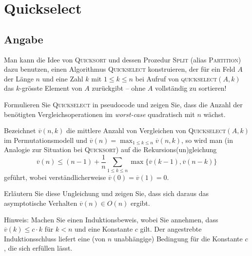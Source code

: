 \section*{Quickselect}

  \newcommand{\meanv}{\overline{v}}
  \lstset{ %
    language=Mathematica,
    basicstyle=\small,
    numbers=left,
    numberstyle=\small,
    numbersep=-9pt
  }
\subsection*{Angabe}
Man kann die Idee von \textsc{Quicksort} und dessen Prozedur \textsc{Split}
(alias \textsc{Partition}) dazu benutzen, einen Algorithmus
\textsc{Quickselect} konstruieren, der für ein Feld $A$ der Länge $n$ und eine
Zahl $k$ mit $1 \leq k \leq n$ bei Aufruf von \textsc{quickselect}$(A,k)$ das
$k$-grösste Element von $A$ zurückgibt -- ohne $A$ vollständig zu sortieren!
\begin{flushenum}
\item
Formulieren Sie \textsc{Quickselect} in pseudocode und zeigen Sie, dass die
Anzahl der benötigten Vergleichsoperationen im \textit{worst-case} quadratisch
mit $n$ wächst.
\item
Bezeichnet $\overline{v}(n,k)$ die mittlere Anzahl von 
Vergleichen von \textsc{Quickselect}$(A,k)$ im Permutationsmodell
und $\overline{v}(n) = \max_{1 \leq k \leq n} \overline{v}(n,k)$,
so wird man (in Analogie zur Situation bei \textsc{Quicksort})
auf die Rekursions(un)gleichung
\begin{equation*}
	\tag{$*$} \overline{v}(n) \leq (n-1)+ \frac{1}{n} \sum_{1 \leq k \leq
	n} \max\{\overline{v}(k-1),\overline{v}(n-k)\}
\end{equation*}
geführt, wobei verständlicherweise $\overline{v}(0)=\overline{v}(1)=0$.

Erläutern Sie diese Ungleichung und zeigen Sie, dass sich
daraus das asymptotische Verhalten $\overline{v}(n) \in O(n)$ ergibt.

Hinweis: Machen Sie einen Induktionsbeweis, wobei Sie annehmen, dass
$\overline{v}(k) \leq c \cdot k$ für $k < n$ und eine Konstante $c$ gilt. Der
angestrebte Induktionsschluss liefert eine (von $n$ unabhängige) Bedingung für
die Konstante $c$, die sich erfüllen lässt.

\end{flushenum}

